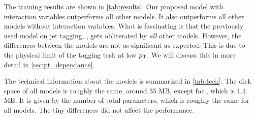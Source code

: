 The training results are shown in \cref{tab:results}. 
Our proposed \depart model with interaction variables outperforms all other models.
It also outperforms all other models without interaction variables.
What is fascinating is that the previously used model on jet tagging, \bdt, gets obliterated by \emph{all} other models.
However, the differences between the models are not as significant as expected.
This is due to the physical limit of the tagging task at low $p_\text{T}$.
We will discuss this in more detail in \cref{sec:pt_dependance}.

The technical information about the models is summarized in \cref{tab:tech}.
The disk space of all models is roughly the same, around 35 MB, except for \bdt, which is 1.4 MB.
It is given by the number of total parameters, which is roughly the same for all models.
The tiny differences did not affect the performance.


